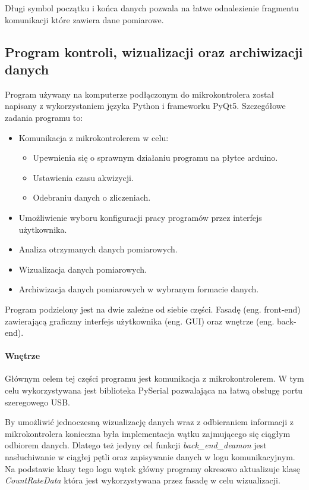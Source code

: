 \documentclass[a4paper,12pt]{article}
\begin{document}
Długi symbol początku i końca danych pozwala na łatwe odnalezienie fragmentu komunikacji które zawiera dane pomiarowe. 

\subsection{Program kontroli, wizualizacji oraz archiwizacji danych}

Program używany na komputerze podłączonym do mikrokontrolera został napisany z wykorzystaniem języka Python i frameworku PyQt5.
Szczegółowe zadania programu to:
\begin{itemize}
        \item Komunikacja z mikrokontrolerem w celu:
        \begin{itemize}
                \item Upewnienia się o sprawnym działaniu programu na płytce arduino.
                \item Ustawienia czasu akwizycji.
                \item Odebraniu danych o zliczeniach. 
        \end{itemize}
        \item Umożliwienie wyboru konfiguracji pracy programów przez interfejs użytkownika.
        \item Analiza otrzymanych danych pomiarowych.
        \item Wizualizacja danych pomiarowych.
        \item Archiwizacja danych pomiarowych w wybranym formacie danych.
\end{itemize}

Program podzielony jest na dwie zależne od siebie części. Fasadę (eng. front-end) zawierającą graficzny interfejs użytkownika (eng. GUI) oraz wnętrze (eng. back-end).

\paragraph{Wnętrze}

Głównym celem tej części programu jest komunikacja z mikrokontrolerem. 
W tym celu wykorzystywana jest biblioteka PySerial\cite{pyserial} pozwalająca na łatwą obsługę portu szeregowego USB. 

By umożliwić jednoczesną wizualizację danych wraz z odbieraniem informacji z mikrokontrolera konieczna była implementacja wątku zajmującego się ciągłym odbiorem danych. 
Dlatego też jedyny cel funkcji \textit{back\_end\_deamon} jest nasłuchiwanie w ciągłej pętli oraz zapisywanie danych w logu komunikacyjnym. 
Na podstawie klasy tego logu wątek główny programy okresowo aktualizuje klasę \textit{CountRateData} która jest wykorzystywana przez fasadę w celu wizualizacji. 
\end{document}
